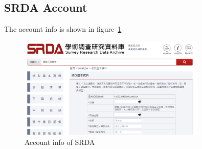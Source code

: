 \subsection{SRDA Account}

The account info is shown in figure~\ref{fig:SRDA_acc}

\begin{figure}[h]
    \centering
    \includegraphics[width = 0.8\textwidth]{image/SRDA.png}
    \caption{Account info of SRDA}
    \label{fig:SRDA_acc}
\end{figure}
